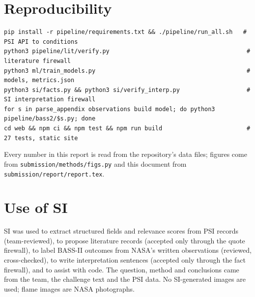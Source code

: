 \documentclass[10pt,letterpaper]{article}
\begin{document}
\section{Reproducibility}
\begin{lstlisting}
pip install -r pipeline/requirements.txt && ./pipeline/run_all.sh   # PSI API to conditions
python3 pipeline/lit/verify.py                                       # literature firewall
python3 ml/train_models.py                                           # models, metrics.json
python3 si/facts.py && python3 si/verify_interp.py                   # SI interpretation firewall
for s in parse_appendix observations build model; do python3 pipeline/bass2/$s.py; done
cd web && npm ci && npm test && npm run build                        # 27 tests, static site
\end{lstlisting}
Every number in this report is read from the repository's data files; figures come from \texttt{submission/\allowbreak methods/\allowbreak figs.py} and this document from \texttt{submission/\allowbreak report/\allowbreak report.tex}.

\section*{Use of SI}
SI was used to extract structured fields and relevance scores from PSI records (team-reviewed), to propose literature records (accepted only through the quote firewall), to label BASS-II outcomes from NASA's written observations (reviewed, cross-checked), to write interpretation sentences (accepted only through the fact firewall), and to assist with code. The question, method and conclusions came from the team, the challenge text and the PSI data. No SI-generated images are used; flame images are NASA photographs.
\end{document}
